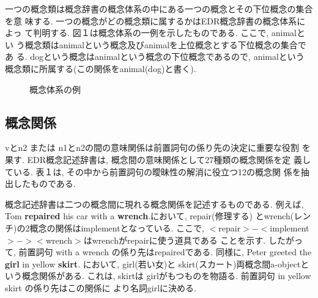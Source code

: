 一つの概念類は概念辞書の概念体系の中にある一つの概念とその下位概念の集合を意
味する. 一つの概念がどの概念類に属するかはEDR概念辞書の概念体系によっ
て判明する. 図１は概念体系の一例を示したものである. ここで, animalとい
う概念類はanimalという概念及びanimalを上位概念とする下位概念の集合であ
る. dogという概念はanimalという概念の下位概念であるので, animalという
概念類に所属する(この関係をanimal(dog)と書く). 

\begin{figure}[h]
 \begin{center}
  
 \end{center}
\caption{概念体系の例}
\end{figure}

\vspace*{-5mm}
\subsection {概念関係}

vとn2 または n1とn2の間の意味関係は前置詞句の係り先の決定に重要な役割
を果す. EDR概念記述辞書は, 概念間の意味関係として27種類の概念関係を定
義している. 表１は, その中から前置詞句の曖昧性の解消に役立つ12の概念関
係を抽出したものである. 

概念記述辞書は二つの概念間に現れる概念関係を記述するものである.
例えば, Tom
{\bf repaired} his car with a {\bf wrench}.において, repair(修理する)
とwrench(レンチ)の2概念の関係はimplementとなっている. ここで,
$<$repair$>-<$implement$>-><$wrench$>$はwrenchがrepairに使う道具である
ことを示す. 
したがって, 前置詞句 with a wrench の係り先はrepairedである. 同様に, 
Peter greeted the {\bf girl} in yellow {\bf skirt}. において, girl(若い女)と 
skirt(スカート)両概念間a-objectという概念関係がある. これは, skirtは
girlがもつものを物語る. 前置詞句 in yellow skirt の係り先はこの関係に
より名詞girlに決める. 

